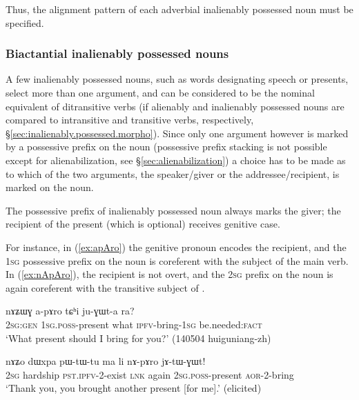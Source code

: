 Thus, the alignment pattern of each adverbial inalienably possessed noun must be specified.

\subsubsection{Biactantial inalienably possessed nouns} \label{sec:biactantial.ipn}
A few inalienably possessed nouns, such as words designating speech or presents, select more than one argument, and can be considered to be the nominal equivalent of ditransitive verbs (if alienably and inalienably possessed nouns are compared to intransitive and transitive verbs, respectively, §\ref{sec:inalienably.possessed.morpho}). Since only one argument however is marked by a possessive prefix on the noun (possessive prefix stacking is not possible except for alienabilization, see §\ref{sec:alienabilization}) a choice has to be made as to which of the two arguments, the speaker/giver or the addressee/recipient, is marked on the noun.

The possessive prefix of inalienably possessed noun  always marks the giver; the recipient of the present (which is optional) receives genitive case. 

For instance, in (\ref{ex:apAro}) the genitive pronoun  encodes the recipient, and the \textsc{1sg} possessive prefix on the noun is coreferent with the subject of the main verb. In (\ref{ex:nApAro}), the recipient is not overt, and the \textsc{2sg} prefix on the noun is again coreferent with the transitive subject of .

\begin{exe}
\ex \label{ex:apAro}
\gll nɤʑɯɣ a-pɤro tɕʰi ju-ɣɯt-a ra? \\
\textsc{2sg}:\textsc{gen} \textsc{1sg}.\textsc{poss}-present what \textsc{ipfv}-bring-\textsc{1sg} be.needed:\textsc{fact} \\
\glt `What present should I bring for you?' (140504 huiguniang-zh)
\end{exe}

\begin{exe}
\ex \label{ex:nApAro}
\gll nɤʑo dɯxpa pɯ-tɯ-tu ma li nɤ-pɤro jɤ-tɯ-ɣɯt! \\
\textsc{2sg} hardship \textsc{pst}.\textsc{ipfv}-2-exist \textsc{lnk} again \textsc{2sg}.\textsc{poss}-present \textsc{aor}-2-bring \\
\glt `Thank you, you brought another present [for me].' (elicited)
\end{exe}

